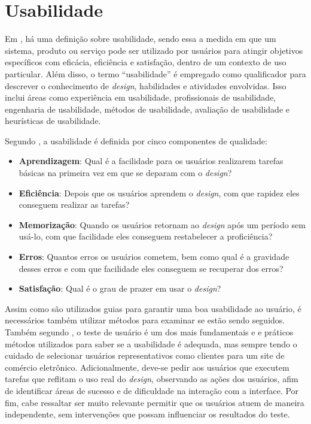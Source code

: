 \section{Usabilidade} \label{usabi}

Em , há uma definição sobre usabilidade, sendo essa a medida em que um sistema, produto ou serviço pode ser utilizado por usuários para atingir objetivos específicos com eficácia, eficiência e satisfação, dentro de um contexto de uso particular. Além disso, o termo ``usabilidade'' é empregado como qualificador para descrever o conhecimento de \textit{design}, habilidades e atividades envolvidas. Isso inclui áreas como experiência em usabilidade, profissionais de usabilidade, engenharia de usabilidade, métodos de usabilidade, avaliação de usabilidade e heurísticas de usabilidade.

Segundo , a usabilidade é definida por cinco componentes de qualidade:

\begin{itemize}
    \item \textbf{Aprendizagem}: Qual é a facilidade para os usuários realizarem tarefas básicas na primeira vez em que se deparam com o \textit{design}?
    \item \textbf{Eficiência}: Depois que os usuários aprendem o \textit{design}, com que rapidez eles conseguem realizar as tarefas?
    \item \textbf{Memorização}: Quando os usuários retornam ao \textit{design} após um período sem usá-lo, com que facilidade eles conseguem restabelecer a proficiência?
    \item \textbf{Erros}: Quantos erros os usuários cometem, bem como qual é a gravidade desses erros e com que facilidade eles conseguem se recuperar dos erros?
    \item \textbf{Satisfação}: Qual é o grau de prazer em usar o \textit{design}?
\end{itemize}

Assim como são utilizados guias para garantir uma boa usabilidade ao usuário, é necessários também utilizar métodos para examinar se estão sendo seguidos. Também segundo , o teste de usuário é um dos mais fundamentais e e práticos métodos utilizados para saber se a usabilidade é adequada, mas sempre tendo o cuidado de selecionar usuários representativos como clientes para um site de comércio eletrônico. Adicionalmente, deve-se pedir aos usuários que executem tarefas que reflitam o uso real do \textit{design}, observando as ações dos usuários, afim de identificar áreas de sucesso e de dificuldade na interação com a interface. Por fim, cabe ressaltar ser muito relevante permitir que os usuários atuem de maneira independente, sem intervenções que possam influenciar os resultados do teste.

